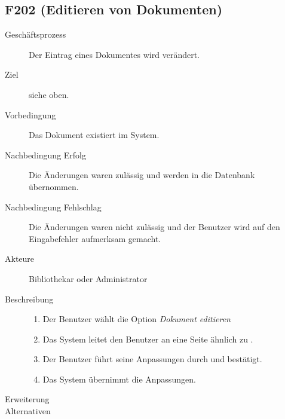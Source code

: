 \subsection{F202 (Editieren von Dokumenten)}
\begin{description}
  \item[Geschäftsprozess]Der Eintrag eines Dokumentes wird verändert.
  \item[Ziel]siehe oben.
  \item[Vorbedingung]Das Dokument existiert im System.
  \item[Nachbedingung Erfolg]Die Änderungen waren zulässig und werden in die Datenbank übernommen.
  \item[Nachbedingung Fehlschlag]Die Änderungen waren nicht zulässig und der Benutzer wird auf den Eingabefehler aufmerksam gemacht.
  \item[Akteure]Bibliothekar oder Administrator
  \item[Beschreibung]\hfill
    \begin{enumerate}
      \item Der Benutzer wählt die Option \emph{Dokument editieren}
      \item Das System leitet den Benutzer an eine Seite ähnlich zu .
      \item Der Benutzer führt seine Anpassungen durch und bestätigt.
      \item Das System übernimmt die Anpassungen.
    \end{enumerate}
  \item[Erweiterung]
  \item[Alternativen]
\end{description}

